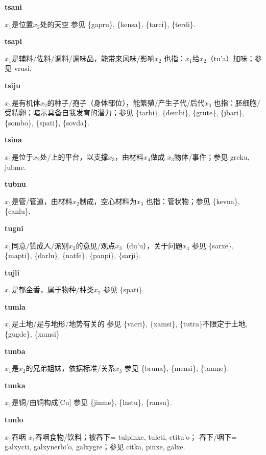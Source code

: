 \documentclass[notitlepage,twocolumn,a4paper,10pt]{book}
\begin{document}
{\sffamily\bfseries tsani}\enspace {\ttfamily\bfseries[tan]}  $x_1$是位置$x_2$处的天空 \textemdash{} 参见 \{gapru\}, \{kensa\}, \{tarci\}, \{terdi\}.

{\sffamily\bfseries tsapi} $x_1$是辅料\slash{}佐料\slash{}调料\slash{}调味品，能带来风味\slash{}影响$x_2$ \textemdash{} 也指：$x_1$给$x_2$（tu'a）加味；参见 {vrusi}.

{\sffamily\bfseries tsiju}\enspace {\ttfamily\bfseries[    tsi]}  $x_1$是有机体$x_2$的种子\slash{}孢子（身体部位），能繁殖\slash{}产生子代\slash{}后代$x_3$ \textemdash{} 也指：胚细胞\slash{}受精卵；暗示具备自我发育的潜力；参见 \{tarbi\}, \{dembi\}, \{grute\}, \{jbari\}, \{sombo\}, \{spati\}, \{sovda\}.

{\sffamily\bfseries tsina}\enspace {\ttfamily\bfseries[sin]}  $x_1$是位于$x_2$处\slash{}上的平台，以支撑$x_3$，由材料$x_4$做成 \textemdash{} $x_3$物体\slash{}事件；参见 {greku}, {jubme}.

{\sffamily\bfseries tubnu}\enspace {\ttfamily\bfseries[        tu'u]}  $x_1$是管\slash{}管道，由材料$x_2$制成，空心材料为$x_3$ \textemdash{} 也指：管状物；参见 \{kevna\}, \{canlu\}.

{\sffamily\bfseries tugni}\enspace {\ttfamily\bfseries[tug     tu'i]}  $x_1$同意\slash{}赞成人\slash{}派别$x_2$的意见\slash{}观点$x_3$（du'u），关于问题$x_4$ \textemdash{} 参见 \{sarxe\}, \{mapti\}, \{darlu\}, \{natfe\}, \{panpi\}, \{sarji\}.

{\sffamily\bfseries tujli}\enspace {\ttfamily\bfseries[tuj]}  $x_1$是郁金香，属于物种\slash{}种类$x_2$ \textemdash{} 参见 \{spati\}.

{\sffamily\bfseries tumla}\enspace {\ttfamily\bfseries[tum     tu'a]}  $x_1$是土地\slash{}是与地形\slash{}地势有关的 \textemdash{} 参见 \{vacri\}, \{xamsi\}, \{tutra\}不限定于土地, \{gugde\}, \{xamsi\}

{\sffamily\bfseries tunba}\enspace {\ttfamily\bfseries[tub]}  $x_1$是$x_2$的兄弟姐妹，依据标准\slash{}关系$x_3$ \textemdash{} 参见 \{bruna\}, \{mensi\}, \{tamne\}.

{\sffamily\bfseries tunka}\enspace {\ttfamily\bfseries[tuk]}  $x_1$是铜\slash{}由铜构成[Cu] \textemdash{} 参见 \{jinme\}, \{lastu\}, \{ransu\}.

{\sffamily\bfseries tunlo}\enspace {\ttfamily\bfseries[tul     tu'o]}  $x_1$吞咽 \textemdash{} $x_1$吞咽食物\slash{}饮料；被吞下= {tulpinxe}, {tulcti}, {ctitu'o}； 吞下\slash{}咽下= {galxycti}, {galxynerbi'o}, {galxygre}；参见 {citka}, {pinxe}, {galxe}.
\end{document}
